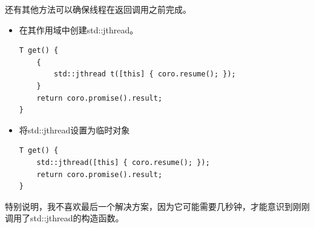 还有其他方法可以确保线程在返回调用之前完成。

\begin{itemize}
\item 
在其作用域中创建std::jthread。

\begin{lstlisting}[style=styleCXX]
T get() {
	{
		std::jthread t([this] { coro.resume(); });
	}
	return coro.promise().result;
}
\end{lstlisting}

\item 
将std::jthread设置为临时对象

\begin{lstlisting}[style=styleCXX]
T get() {
	std::jthread([this] { coro.resume(); });
	return coro.promise().result;
}
\end{lstlisting}

\end{itemize}

特别说明，我不喜欢最后一个解决方案，因为它可能需要几秒钟，才能意识到刚刚调用了std::jthread的构造函数。

\newpage
